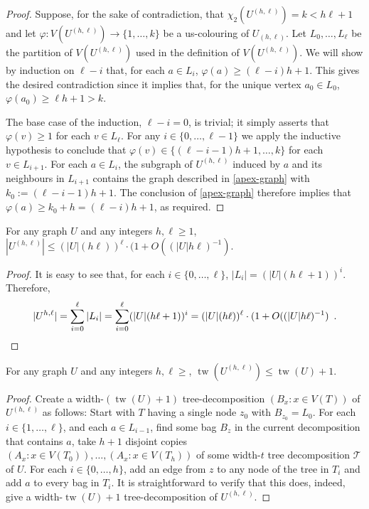 \documentclass[kpfonts]{patmorin}
\DeclareMathOperator{\tw}{tw}
\newcommand{\uqs}{\chi_2}
\begin{document}
\begin{proof}
    Suppose, for the sake of contradiction, that $\uqs(U^{(h,\ell)})=k<h\ell+1$ and let $\varphi:V(U^{(h,\ell)})\to\{1,\ldots,k\}$ be a us-colouring of $U_{(h,\ell)}$.  Let $L_0,\ldots,L_{\ell}$ be the partition of $V(U^{(h,\ell)})$ used in the definition of $V(U^{(h,\ell)})$.
    We will show by induction on $\ell-i$ that, for each $a\in L_{i}$, $\varphi(a)\ge(\ell-i)h+1$. This gives the desired contradiction since it implies that, for the unique vertex $a_0\in L_0$, $\varphi(a_0)\ge \ell h+1 > k$.

    The base case of the induction, $\ell-i=0$, is trivial; it simply asserts that $\varphi(v)\ge 1$ for each $v\in L_\ell$.  For any $i\in\{0,\ldots,\ell-1\}$ we apply the inductive hypothesis to conclude that $\varphi(v)\in\{(\ell-i-1)h+1,\ldots,k\}$ for each $v\in L_{i+1}$.  For each $a\in L_i$, the subgraph of $U^{(h,\ell)}$ induced by $a$ and its neighbours in $L_{i+1}$ contains the graph described in \cref{apex-graph} with $k_0:=(\ell-i-1)h+1$.  The conclusion of \cref{apex-graph} therefore implies that $\varphi(a)\ge k_0+h=(\ell-i)h+1$, as required.
\end{proof}

\begin{lem}\label{boost-size}
    For any graph $U$ and any integers $h,\ell \ge 1$, $|U^{(h,\ell)}| \le (|U|(h\ell))^{\ell}\cdot (1+O((|U|h\ell)^{-1})$.
\end{lem}

\begin{proof}
    It is easy to see that, for each $i\in \{0,\ldots,\ell\}$, $|L_i|=(|U|(h\ell+1))^i$.  Therefore,
    \[ |U^{h,\ell}| = \sum_{i=0}^\ell |L_i| = \sum_{i=0}^\ell (|U|(h\ell+1))^i = (|U|(h\ell))^{\ell}\cdot (1+O((|U|h\ell)^{-1}) \enspace . \qedhere
    \]
\end{proof}


\begin{lem}\label{boost-treewidth}
    For any graph $U$ and any integers $h,\ell\ge$, $\tw(U^{(h,\ell)})\le \tw(U)+1$.
\end{lem}

\begin{proof}
  Create a width-$(\tw(U)+1)$ tree-decomposition $(B_x:x\in V(T))$ of $U^{(h,\ell)}$ as follows: Start with $T$ having a single node $z_0$ with $B_{z_0}=L_0$.  For each $i\in\{1,\ldots,\ell\}$, and each $a\in L_{i-1}$, find some bag $B_z$ in the current decomposition that contains $a$, take $h+1$ disjoint copies $(A_x:x\in V(T_0)),\ldots,(A_x:x\in V(T_h))$ of some width-$t$ tree decomposition $\mathcal{T}$ of $U$.  For each $i\in\{0,\ldots,h\}$, add an edge from $z$ to any node of the tree in $T_i$ and add $a$ to every bag in $T_i$.  It is straightforward to verify that this does, indeed, give a width-$\tw(U)+1$ tree-decomposition of $U^{(h,\ell)}$.
\end{proof}
\end{document}
